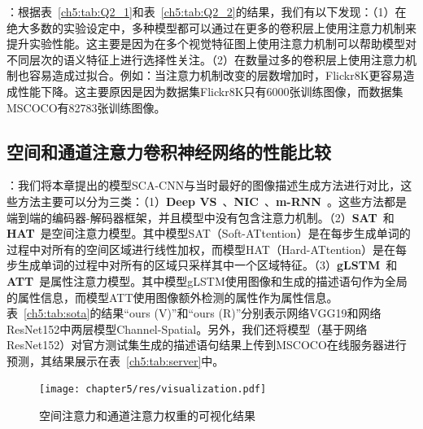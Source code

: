 \textbf{}：根据表~\ref{ch5:tab:Q2_1}和表~\ref{ch5:tab:Q2_2}的结果，我们有以下发现：（1）在绝大多数的实验设定中，多种模型都可以通过在更多的卷积层上使用注意力机制来提升实验性能。这主要是因为在多个视觉特征图上使用注意力机制可以帮助模型对不同层次的语义特征上进行选择性关注。（2）在数量过多的卷积层上使用注意力机制也容易造成过拟合。例如：当注意力机制改变的层数增加时，Flickr8K更容易造成性能下降。这主要原因是因为数据集Flickr8K只有6000张训练图像，而数据集MSCOCO有82783张训练图像。


\subsection{空间和通道注意力卷积神经网络的性能比较}

\textbf{}：我们将本章提出的模型SCA-CNN与当时最好的图像描述生成方法进行对比，这些方法主要可以分为三类：（1）\textbf{Deep VS}~\cite{karpathy2015deep}、\textbf{NIC}~\cite{vinyals2015show}、\textbf{m-RNN}~\cite{mao2015deep}。这些方法都是端到端的编码器-解码器框架，并且模型中没有包含注意力机制。（2）\textbf{SAT}~\cite{xu2015show}和\textbf{HAT}~\cite{xu2015show}是空间注意力模型。其中模型SAT（Soft-ATtention）是在每步生成单词的过程中对所有的空间区域进行线性加权，而模型HAT（Hard-ATtention）是在每步生成单词的过程中对所有的区域只采样其中一个区域特征。（3）\textbf{gLSTM}~\cite{jia2015guiding}和\textbf{ATT}~\cite{you2016image}是属性注意力模型。其中模型gLSTM使用图像和生成的描述语句作为全局的属性信息，而模型ATT使用图像额外检测的属性作为属性信息。表~\ref{ch5:tab:sota}的结果“ours (V)”和“ours (R)”分别表示网络VGG19和网络ResNet152中两层模型Channel-Spatial。另外，我们还将模型（基于网络ResNet152）对官方测试集生成的描述语句结果上传到MSCOCO在线服务器进行预测，其结果展示在表~\ref{ch5:tab:server}中。

\begin{figure}[t]
    \centering
    \texttt{[image: chapter5/res/visualization.pdf]}
    \caption{空间注意力和通道注意力权重的可视化结果}
    \label{ch5:fig:visualization}
\end{figure}

